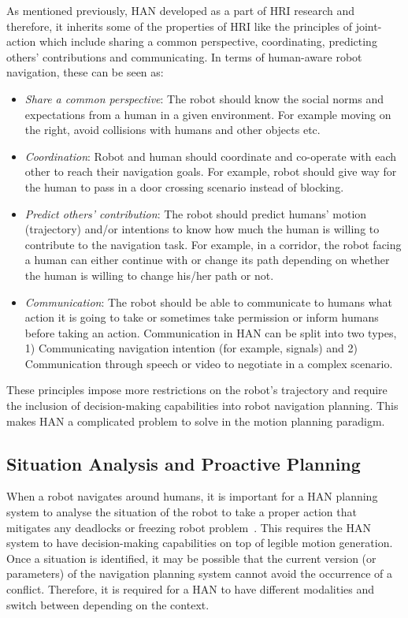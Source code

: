 As mentioned previously, HAN developed as a part of HRI research and therefore, it inherits some of the properties of HRI like the principles of joint-action \cite{curioni2019joint} which include sharing a common perspective, coordinating, predicting others' contributions and communicating. In terms of human-aware robot navigation, these can be seen as:
\begin{itemize}[leftmargin=*]
    \item \textit{Share a common perspective}: The robot should know the social norms and expectations from a human in a given environment. For example moving on the right, avoid collisions with humans and other objects etc.
    \item \textit{Coordination}: Robot and human should coordinate and co-operate with each other to reach their navigation goals. For example, robot should give way for the human to pass in a door crossing scenario instead of blocking.
    \item \textit{Predict others' contribution}: The robot should predict humans' motion (trajectory) and/or intentions to know how much the human is willing to contribute to the navigation task. For example, in a corridor, the robot facing a human can either continue with or change its path depending on whether the human is willing to change his/her path or not. 
    \item \textit{Communication}: The robot should be able to communicate to humans what action it is going to take or sometimes take permission or inform humans before taking an action. Communication in HAN can be split into two types, 1) Communicating navigation intention (for example, signals) and 2) Communication through speech or video to negotiate in a complex scenario.
\end{itemize}
These principles impose more restrictions on the robot's trajectory and require the inclusion of decision-making capabilities into robot navigation planning. This makes HAN a complicated problem to solve in the motion planning paradigm. 

\subsection*{Situation Analysis and Proactive Planning}
When a robot navigates around humans, it is important for a HAN planning system to analyse the situation of the robot to take a proper action that mitigates any deadlocks or freezing robot problem~\cite{trautman2010unfreezing}. This requires the HAN system to have decision-making capabilities on top of legible motion generation. Once a situation is identified, it may be possible that the current version (or parameters) of the navigation planning system cannot avoid the occurrence of a conflict. Therefore, it is required for a HAN to have different modalities and switch between depending on the context. 

